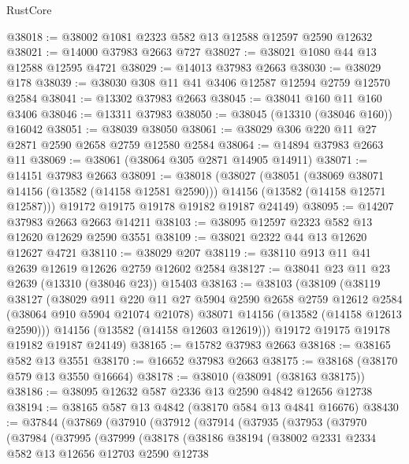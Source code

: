 \begin{lexlean}{RustCore}
\begin{coremodule}
@38018 := @38002 @1081 @2323 @582 @13 @12588 @12597 @2590 @12632
@38021 := @14000 @37983 @2663 @727
@38027 := @38021 @1080 @44 @13 @12588 @12595 @4721
@38029 := @14013 @37983 @2663
@38030 := @38029 @178
@38039 := @38030 @308 @11 @41 @3406 @12587 @12594 @2759 @12570 @2584
@38041 := @13302 @37983 @2663
@38045 := @38041 @160 @11 @160 @3406
@38046 := @13311 @37983
@38050 := @38045 (@13310 (@38046 @160)) @16042
@38051 := @38039 @38050
@38061 := @38029 @306 @220 @11 @27 @2871 @2590 @2658 @2759 @12580 @2584
@38064 := @14894 @37983 @2663 @11
@38069 := @38061 (@38064 @305 @2871 @14905 @14911)
@38071 := @14151 @37983 @2663
@38091 := @38018
    (@38027
      (@38051
        (@38069 @38071 @14156 (@13582 (@14158 @12581 @2590)))
        @14156
        (@13582 (@14158 @12571 @12587)))
      @19172
      @19175
      @19178
      @19182
      @19187
      @24149)
@38095 := @14207 @37983 @2663 @2663 @14211
@38103 := @38095 @12597 @2323 @582 @13 @12620 @12629 @2590 @3551
@38109 := @38021 @2322 @44 @13 @12620 @12627 @4721
@38110 := @38029 @207
@38119 := @38110 @913 @11 @41 @2639 @12619 @12626 @2759 @12602 @2584
@38127 := @38041 @23 @11 @23 @2639 (@13310 (@38046 @23)) @15403
@38163 := @38103
    (@38109
      (@38119
        @38127
        (@38029
          @911
          @220
          @11
          @27
          @5904
          @2590
          @2658
          @2759
          @12612
          @2584
          (@38064 @910 @5904 @21074 @21078)
          @38071
          @14156
          (@13582 (@14158 @12613 @2590)))
        @14156
        (@13582 (@14158 @12603 @12619)))
      @19172
      @19175
      @19178
      @19182
      @19187
      @24149)
@38165 := @15782 @37983 @2663
@38168 := @38165 @582 @13 @3551
@38170 := @16652 @37983 @2663
@38175 := @38168 (@38170 @579 @13 @3550 @16664)
@38178 := @38010 (@38091 (@38163 @38175))
@38186 := @38095 @12632 @587 @2336 @13 @2590 @4842 @12656 @12738
@38194 := @38165 @587 @13 @4842 (@38170 @584 @13 @4841 @16676)
@38430 := @37844
    (@37869
      (@37910
        (@37912
          (@37914
            (@37935
              (@37953
                (@37970
                  (@37984
                    (@37995
                      (@37999
                        (@38178
                          (@38186
                            @38194
                            (@38002
                              @2331
                              @2334
                              @582
                              @13
                              @12656
                              @12703
                              @2590
                              @12738

\end{coremodule}
\end{lexlean}
